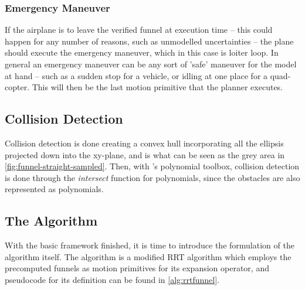 \subsubsection{Emergency Maneuver}

If the airplane is to leave the verified funnel at execution time -- this could
happen for any number of reasons, such as unmodelled uncertainties -- the plane
should execute the emergency maneuver, which in this case is loiter loop. In
general an emergency maneuver can be any sort of 'safe' maneuver for the model
at hand -- such as a sudden stop for a vehicle, or idling at one place for a
quad-copter. This will then be the last motion primitive that the planner
executes.

\subsection{Collision Detection}

Collision detection is done creating a convex hull incorporating all the
ellipsis projected down into the xy-plane, and is what can be seen as the grey
area in \cref{fig:funnel-straight-sampled}. Then, with \matlab's polynomial
toolbox, collision detection is done through the \textit{intersect} function for
polynomials, since the obstacles are also represented as polynomials.

\subsection{The \rrtfunnel{} Algorithm}

With the basic framework finished, it is time to introduce the formulation of
the \rrtfunnel{} algorithm itself. The \rrtfunnel{} algorithm is a modified
\ac{RRT} algorithm which employs the precomputed funnels as motion primitives
for its expansion operator, and pseudocode for its definition can be found in
\cref{alg:rrtfunnel}.

